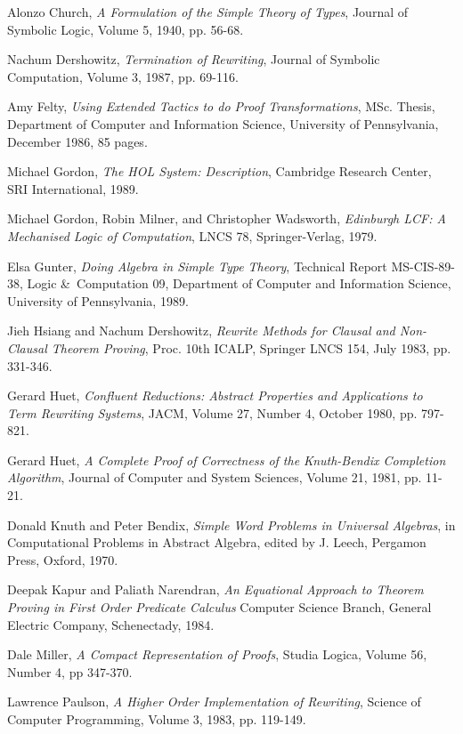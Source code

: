\begin{thebibliography}{Therearemanygoats}

Alonzo Church,
{\it A Formulation of the Simple Theory of Types},
Journal of Symbolic Logic,
Volume 5,
1940,
pp. 56-68.

Nachum Dershowitz,
{\it Termination of Rewriting},
Journal of Symbolic Computation,
Volume 3,
1987,
pp. 69-116.

Amy Felty,
{\it Using Extended Tactics to do Proof Transformations},
MSc. Thesis,
Department of Computer and Information Science,
University of Pennsylvania,
December 1986,
85 pages.

Michael Gordon,
{\it The HOL System: Description},
Cambridge Research Center, SRI International,
1989.

Michael Gordon, Robin Milner, and Christopher Wadsworth,
{\it Edinburgh LCF: A Mechanised Logic of Computation},
LNCS 78,
Springer-Verlag,
1979.

Elsa Gunter,
{\it Doing Algebra in Simple Type Theory},
Technical Report MS-CIS-89-38, Logic \&\ Computation 09,
Department of Computer and Information Science, 
University of Pennsylvania,
1989.

Jieh Hsiang and Nachum Dershowitz,
{\it Rewrite Methods for Clausal and Non-Clausal Theorem Proving},
Proc. 10th ICALP,
Springer LNCS 154,
July 1983,
pp. 331-346.

Gerard Huet,
{\it Confluent Reductions: Abstract Properties and Applications to Term Rewriting Systems},
JACM,
Volume 27, Number 4,
October 1980,
pp. 797-821.

Gerard Huet,
{\it A Complete Proof of Correctness of the Knuth-Bendix Completion Algorithm},
Journal of Computer and System Sciences,
Volume 21,
1981,
pp. 11-21.

Donald Knuth and Peter Bendix,
{\it Simple Word Problems in Universal Algebras},
in Computational Problems in Abstract Algebra,
edited by J. Leech,
Pergamon Press,
Oxford,
1970.

Deepak Kapur and Paliath Narendran,
{\it An Equational Approach to Theorem Proving in First Order Predicate Calculus}
Computer Science Branch,
General Electric Company,
Schenectady,
1984.

Dale Miller,
{\it A Compact Representation of Proofs},
Studia Logica,
Volume 56, Number 4,
pp 347-370.

Lawrence Paulson,
{\it A Higher Order Implementation of Rewriting},
Science of Computer Programming,
Volume 3,
1983,
pp. 119-149.

\end{thebibliography}

